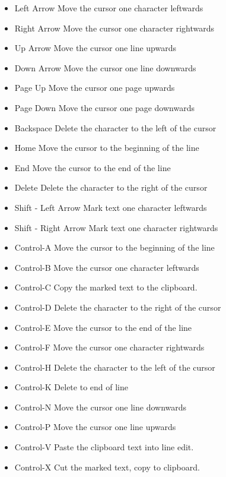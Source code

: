 \documentclass{article}
\begin{document}
\begin{itemize}
\item {\ttfamily Left Arrow} Move the cursor one character leftwards 
\item {\ttfamily Right Arrow} Move the cursor one character rightwards 
\item {\ttfamily Up Arrow} Move the cursor one line upwards 
\item {\ttfamily Down Arrow} Move the cursor one line downwards 
\item {\ttfamily Page Up} Move the cursor one page upwards 
\item {\ttfamily Page Down} Move the cursor one page downwards 
\item {\ttfamily Backspace} Delete the character to the left of the cursor 
\item {\ttfamily Home} Move the cursor to the beginning of the line 
\item {\ttfamily End} Move the cursor to the end of the line 
\item {\ttfamily Delete} Delete the character to the right of the cursor 
\item {\ttfamily Shift - Left Arrow} Mark text one character leftwards 
\item {\ttfamily Shift - Right Arrow} Mark text one character rightwards 
\item {\ttfamily Control-A} Move the cursor to the beginning of the line 
\item {\ttfamily Control-B} Move the cursor one character leftwards 
\item {\ttfamily Control-C} Copy the marked text to the clipboard. 
\item {\ttfamily Control-D} Delete the character to the right of the cursor 
\item {\ttfamily Control-E} Move the cursor to the end of the line 
\item {\ttfamily Control-F} Move the cursor one character rightwards 
\item {\ttfamily Control-H} Delete the character to the left of the cursor 
\item {\ttfamily Control-K} Delete to end of line 
\item {\ttfamily Control-N} Move the cursor one line downwards 
\item {\ttfamily Control-P} Move the cursor one line upwards 
\item {\ttfamily Control-V} Paste the clipboard text into line edit. 
\item {\ttfamily Control-X} Cut the marked text, copy to clipboard. 
\end{itemize}
\end{document}
